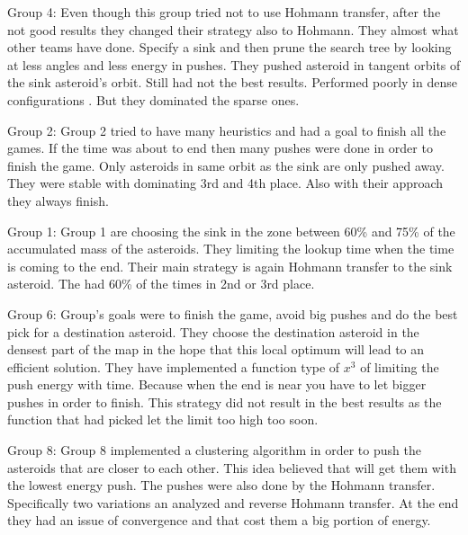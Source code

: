 Group 4:
Even though this group tried not to use Hohmann transfer, after the not good 
results they changed their strategy also to Hohmann. They almost what other teams
have done. Specify a sink and then prune the search tree by looking at less angles
and less energy in pushes. They pushed asteroid in tangent orbits of the sink 
asteroid's orbit. Still had not the best results. Performed poorly in dense 
configurations . But they dominated the sparse ones.

Group 2:
Group 2 tried to have many heuristics and had a goal to finish all the games.
If the time was about to end then many pushes were done in order to finish the 
game. Only asteroids in same orbit as the sink are only pushed away. They were
stable with dominating 3rd and 4th place. Also with their approach they always
finish.

Group 1:
Group 1 are choosing the sink in the zone between 60\% and 75\% of the accumulated 
mass of the asteroids. They limiting the lookup time when the time is coming to 
the end. Their main strategy is again Hohmann transfer to the sink asteroid. The
had 60\% of the times in 2nd or 3rd place.

Group 6:
Group's goals were to finish the game, avoid big pushes and do the best pick for
a destination asteroid. They choose the destination asteroid in the densest part
of the map in the hope that this local optimum will lead to an efficient solution.
They have implemented a function type of $x^3$ of limiting the push energy with
time. Because when the end is near you have to let bigger pushes in order to finish.
This strategy did not result in the best results as the function that had picked
let the limit too high too soon.

Group 8:
Group 8 implemented a clustering algorithm in order to push the asteroids that 
are closer to each other. This idea believed that will get them with the lowest
energy push. The pushes were also done by the Hohmann transfer. Specifically two
variations an analyzed and reverse Hohmann transfer. At the end they had an issue
of convergence and that cost them a big portion of energy.
